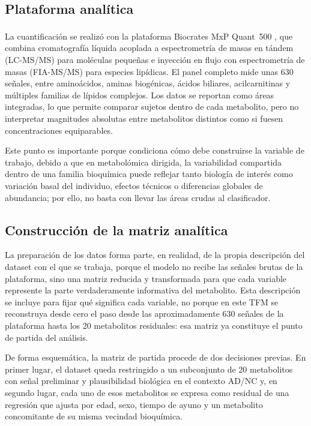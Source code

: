 \subsection{Plataforma analítica}\label{sec:biocrates}

La cuantificación se realizó con la plataforma Biocrates MxP\textsuperscript{\textregistered} Quant~500
\parencite{biocrates2020}, que combina cromatografía líquida acoplada a espectrometría de masas en tándem (LC-MS/MS)
para moléculas pequeñas e inyección en flujo con espectrometría de masas (FIA-MS/MS) para especies lipídicas. El panel
completo mide unas 630 señales, entre aminoácidos, aminas biogénicas, ácidos biliares, acilcarnitinas y múltiples
familias de lípidos complejos. Los datos se reportan como áreas integradas, lo que permite comparar sujetos dentro de
cada metabolito, pero no interpretar magnitudes absolutas entre metabolitos distintos como si fuesen concentraciones
equiparables.

Este punto es importante porque condiciona cómo debe construirse la variable de trabajo, debido a que en metabolómica
dirigida, la variabilidad compartida dentro de una familia bioquímica puede reflejar tanto biología de interés como
variación basal del individuo, efectos técnicos o diferencias globales de abundancia; por ello, no basta con llevar las
áreas crudas al clasificador.

\subsection{Construcción de la matriz analítica}\label{sec:matriz_analitica}

La preparación de los datos forma parte, en realidad, de la propia descripción del dataset con el que se trabaja, porque
el modelo no recibe las señales brutas de la plataforma, sino una matriz reducida y transformada para que cada variable
represente la parte verdaderamente informativa del metabolito. Esta descripción se incluye para fijar qué significa cada
variable, no porque en este TFM se reconstruya desde cero el paso desde las aproximadamente 630 señales de la plataforma
hasta los 20 metabolitos residuales: esa matriz ya constituye el punto de partida del análisis.

De forma esquemática, la matriz de partida procede de dos decisiones previas. En primer lugar, el dataset queda
restringido a un subconjunto de 20 metabolitos con señal preliminar y plausibilidad biológica en el contexto AD/NC y,
en segundo lugar, cada uno de esos metabolitos se expresa como residual de una regresión que ajusta por edad, sexo,
tiempo de ayuno y un metabolito concomitante de su misma vecindad bioquímica.


